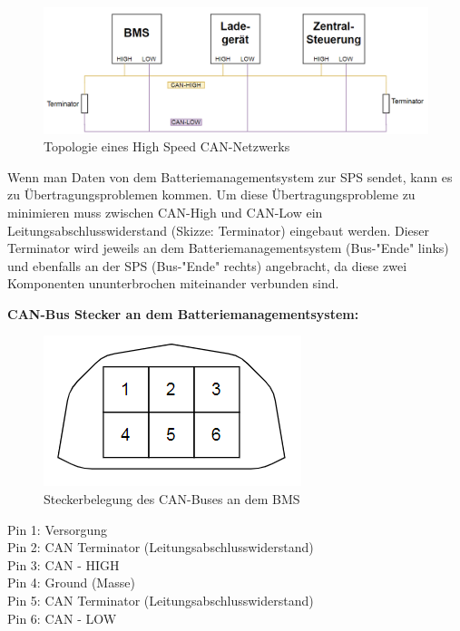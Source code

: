 \begin{figure}[H]
	\begin{center}
		\includegraphics[scale=0.7]{figures/Akku/TopologieCAN-Netzwerks.PNG}
		\caption{Topologie eines High Speed CAN-Netzwerks}
		\label{fig: Topologie eines High Speed CAN-Netzwerks}
	\end{center}
\end{figure}

Wenn man Daten von dem Batteriemanagementsystem zur SPS sendet, kann es zu Übertragungsproblemen kommen. Um diese Übertragungsprobleme zu minimieren muss zwischen CAN-High und CAN-Low ein Leitungsabschlusswiderstand (Skizze: Terminator) eingebaut werden. Dieser Terminator wird jeweils an dem Batteriemanagementsystem (Bus-"Ende" links) und ebenfalls an der SPS (Bus-"Ende" rechts) angebracht, da diese zwei Komponenten ununterbrochen miteinander verbunden sind. 

\textbf{CAN-Bus Stecker an dem Batteriemanagementsystem:}

\begin{figure}[H]
	\begin{center}
		\includegraphics[scale=0.7]{figures/Akku/CANStecker.PNG}
		\caption{Steckerbelegung des CAN-Buses an dem BMS}
		\label{fig: Steckerbelegung des CAN-Buses an dem BMS}
	\end{center}
\end{figure}

Pin 1: Versorgung\\
Pin 2: CAN Terminator (Leitungsabschlusswiderstand)\\
Pin 3: CAN - HIGH\\
Pin 4: Ground (Masse)\\
Pin 5: CAN Terminator (Leitungsabschlusswiderstand)\\
Pin 6: CAN - LOW\\
\newpage


